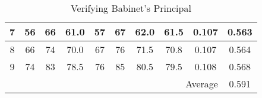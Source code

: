 \begin{table}[H]
{\begin{tabular}{ccccccccc|c|}
	\multicolumn{1}{|c|}{7} & \multicolumn{1}{c|}{56} & \multicolumn{1}{c|}{66} & \multicolumn{1}{c|}{61.0} & \multicolumn{1}{c|}{57} & \multicolumn{1}{c|}{67} & \multicolumn{1}{c|}{62.0} & \multicolumn{1}{c|}{61.5} & 0.107 & 0.563 \\ \hline
	\multicolumn{1}{|c|}{8} & \multicolumn{1}{c|}{66} & \multicolumn{1}{c|}{74} & \multicolumn{1}{c|}{70.0} & \multicolumn{1}{c|}{67} & \multicolumn{1}{c|}{76} & \multicolumn{1}{c|}{71.5} & \multicolumn{1}{c|}{70.8} & 0.107 & 0.564 \\ \hline
	\multicolumn{1}{|c|}{9} & \multicolumn{1}{c|}{74} & \multicolumn{1}{c|}{83} & \multicolumn{1}{c|}{78.5} & \multicolumn{1}{c|}{76} & \multicolumn{1}{c|}{85} & \multicolumn{1}{c|}{80.5} & \multicolumn{1}{c|}{79.5} & 0.108 & 0.568 \\ \hline
	 &  &  &  &  & \multicolumn{1}{c|}{} & \multicolumn{3}{r|}{Average} & 0.591 \\ \cline{7-10} 
	\end{tabular}%
	}
	\caption{Verifying Babinet's Principal}
	\label{tab:3}
\end{table}